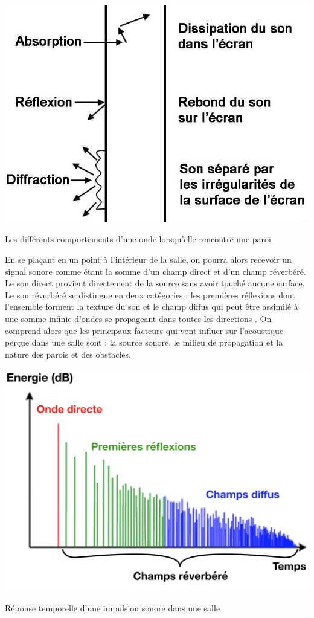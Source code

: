 \begin{figureth}
	\includegraphics[width=0.5\linewidth]{images/schema_ecran_antibruit}
	\caption[Les différents comportements d'une onde lorsqu'elle rencontre une paroi]{Les différents comportements d'une onde lorsqu'elle rencontre une paroi \footnotemark}
	\label{schema_absorption}
\end{figureth}

En se plaçant en un point à l'intérieur de la salle, on pourra alors recevoir un signal sonore comme étant la somme d'un champ direct et d’un champ réverbéré. Le son direct provient directement de la source sans avoir touché aucune surface. Le son réverbéré se distingue en deux catégories : les premières réflexions dont l'ensemble forment la texture du son et le champ diffus qui peut être assimilé à une somme infinie d'ondes se propageant dans toutes les directions \cite[p. 9]{jouhaneau}.
On comprend alors que les principaux facteurs qui vont influer sur l'acoustique perçue dans une salle sont : la source sonore, le milieu de propagation et la nature des parois et des obstacles.

\begin{figureth}
	\includegraphics[width=0.7\linewidth]{images/RIR_schematique}
	\caption{Réponse temporelle d'une impulsion sonore dans une salle}
	\label{RIR_schematique}
\end{figureth}

